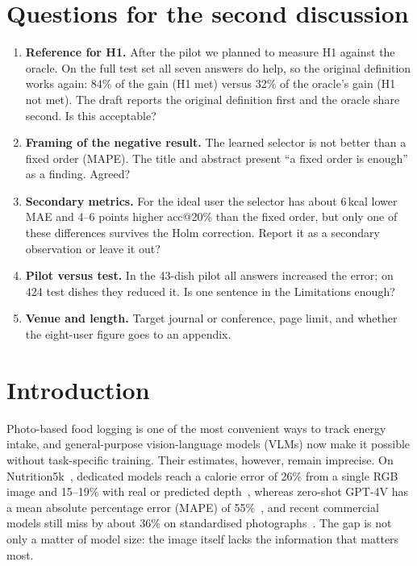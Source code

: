 \documentclass[twocolumn]{svjour3}
\begin{document}
\section*{Questions for the second discussion}
\begin{enumerate}
  \item \textbf{Reference for H1.} After the pilot we planned to measure H1 against the oracle. On the full
        test set all seven answers do help, so the original definition works again: 84\% of the gain
        (H1 met) versus 32\% of the oracle's gain (H1 not met). The draft reports the original definition
        first and the oracle share second. Is this acceptable?
  \item \textbf{Framing of the negative result.} The learned selector is not better than a fixed order
        (MAPE). The title and abstract present ``a fixed order is enough'' as a finding. Agreed?
  \item \textbf{Secondary metrics.} For the ideal user the selector has about 6\,kcal lower MAE and 4--6
        points higher acc@20\% than the fixed order, but only one of these differences survives the Holm
        correction. Report it as a secondary observation or leave it out?
  \item \textbf{Pilot versus test.} In the 43-dish pilot all answers increased the error; on 424 test dishes
        they reduced it. Is one sentence in the Limitations enough?
  \item \textbf{Venue and length.} Target journal or conference, page limit, and whether the eight-user
        figure goes to an appendix.
\end{enumerate}

\section{Introduction}
\label{sec:intro}

Photo-based food logging is one of the most convenient ways to track energy intake, and general-purpose
vision-language models (VLMs) now make it possible without task-specific training. Their estimates,
however, remain imprecise. On Nutrition5k~\cite{thames2021nutrition5k}, dedicated models reach a calorie
error of 26\% from a single RGB image and 15--19\% with real or predicted
depth~\cite{thames2021nutrition5k,han2023dpf}, whereas zero-shot GPT-4V has a mean absolute percentage
error (MAPE) of 55\%~\cite{tanabe2024calorielava}, and recent commercial models still miss by about 36\%
on standardised photographs~\cite{fridolfsson2025llm}. The gap is not only a matter of model size: the
image itself lacks the information that matters most.
\end{document}
